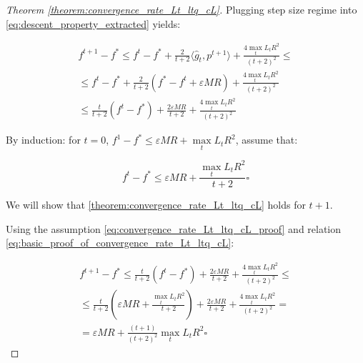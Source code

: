 \documentclass[runningheads, final]{llncs}
\newcommand{\vprod}[1]{\langle#1\rangle}
\newcommand{\errgrad}{\hat{g}}
\begin{document}
\begin{proof}[Theorem \ref{theorem:convergence_rate_Lt_ltq_cL}]
    Plugging step size regime into \eqref{eq:descent_property_extracted} yields:

    \begin{equation}\label{eq:basic_proof_of_convergence_rate_Lt_ltq_cL}
        \begin{split}
            f^{t + 1} - f^* \leqslant f^t - f^* + \frac{2}{t + 2}
            \vprod{\errgrad_t, p^{t + 1}} +
            \frac{4 \max\limits_t{L_t} R^2}{(t + 2)^2} \leqslant \\
            \leqslant f^t - f^* + \frac{2}{t + 2} (f^* - f^t + \varepsilon M R) +
            \frac{4 \max\limits_t{L_t} R^2}{(t + 2)^2}           \\
            \leqslant \frac{t}{t + 2}(f^t - f^*) +
            \frac{2 \varepsilon M R}{t + 2} +
            \frac{4 \max\limits_t{L_t} R^2}{(t + 2)^2}
        \end{split}
    \end{equation}

    By induction: for $t = 0$, $f^1 - f^* \leqslant \varepsilon M R +
        \max\limits_t{L_t} R^2$, assume that:

    \begin{equation}\label{eq:convergence_rate_Lt_ltq_cL_proof}
        f^t - f^* \leqslant \varepsilon M R + \frac{\max\limits_t{L_t} R^2}{t + 2}
        \square
    \end{equation}

    We will show that \ref{theorem:convergence_rate_Lt_ltq_cL} holds for $t + 1$.

    Using the assumption \eqref{eq:convergence_rate_Lt_ltq_cL_proof} and relation
    \eqref{eq:basic_proof_of_convergence_rate_Lt_ltq_cL}:

    \begin{equation}
        \begin{split}
            f^{t + 1} - f^* \leqslant \frac{t}{t + 2}(f^t - f^*) +
            \frac{2 \varepsilon M R}{t + 2} +
            \frac{4 \max\limits_t{L_t} R^2}{(t + 2)^2} \leqslant \\
            \leqslant \frac{t}{t + 2}(\varepsilon M R +
            \frac{\max\limits_t{L_t} R^2}{t + 2})
            + \frac{2 \varepsilon M R}{t + 2}
            + \frac{4 \max\limits_t{L_t} R^2}{(t + 2)^2} =       \\
            = \varepsilon M R + \frac{(t + 1)}{(t + 2)^2} \max\limits_t{L_t} R^2
            \square
        \end{split}
    \end{equation}


\end{proof}
\end{document}
